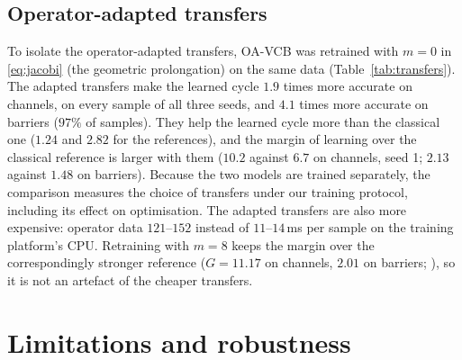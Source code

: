 \subsection{Operator-adapted transfers}\label{sec:transfers}

To isolate the operator-adapted transfers, OA-VCB was retrained with $m=0$ in \eqref{eq:jacobi} (the geometric prolongation)
on the same data (Table~\ref{tab:transfers}). The adapted transfers make the learned cycle $1.9$ times more accurate on
channels, on every sample of all three seeds, and $4.1$ times more accurate on barriers ($97\%$ of samples). They help the
learned cycle more than the classical one ($1.24$ and $2.82$ for the references), and the margin of learning over the classical
reference is larger with them ($10.2$ against $6.7$ on channels, seed 1; $2.13$ against $1.48$ on barriers). Because the two
models are trained separately, the comparison measures the choice of transfers under our training protocol, including its
effect on optimisation. The adapted transfers are also more expensive: operator data $121$--$152$ instead of $11$--$14$\,ms per
sample on the training platform's CPU. Retraining with $m = 8$ keeps the margin over the correspondingly stronger reference
($G = 11.17$ on channels, $2.01$ on barriers; ), so it is not an artefact of the cheaper transfers.

\section{Limitations and robustness}\label{sec:failure}

